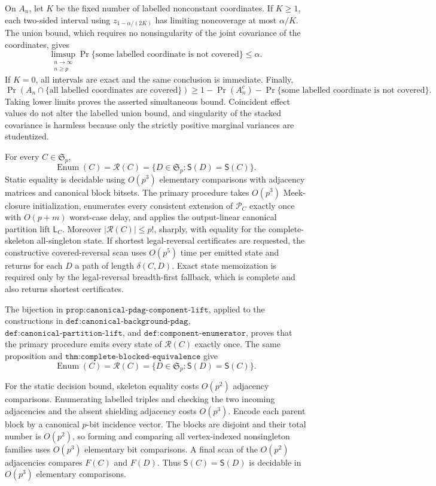 On \(A_n\), let \(K\) be the fixed number of labelled nonconstant coordinates. If \(K\geq1\), each two-sided interval using \(z_{1-\alpha/(2K)}\) has limiting noncoverage at most \(\alpha/K\). The union bound, which requires no nonsingularity of the joint covariance of the coordinates, gives
\[
 \limsup_{\substack{n\to\infty\\ n\geq p}}
 \Pr\{\text{some labelled coordinate is not covered}\}
 \leq\alpha.
\]
If \(K=0\), all intervals are exact and the same conclusion is immediate. Finally,
\[
 \Pr(A_n\cap\{\text{all labelled coordinates are covered}\})
 \geq1-\Pr(A_n^c)
 -\Pr\{\text{some labelled coordinate is not covered}\}.
\]
Taking lower limits proves the asserted simultaneous bound. Coincident effect values do not alter the labelled union bound, and singularity of the stacked covariance is harmless because only the strictly positive marginal variances are studentized.

For every \(C\in\mathfrak S_p\),
\[
 \operatorname{Enum}(C)=\mathcal R(C)
 =\{D\in\mathfrak S_p:\mathsf S(D)=\mathsf S(C)\}.
\]
Static equality is decidable using \(O(p^3)\) elementary comparisons with adjacency matrices and canonical block bitsets. The primary procedure takes \(O(p^3)\) Meek-closure initialization, enumerates every consistent extension of \(\mathcal P_C\) exactly once with \(O(p+m)\) worst-case delay, and applies the output-linear canonical partition lift \(\mathsf L_C\). Moreover \(|\mathcal R(C)|\leq p!\), sharply, with equality for the complete-skeleton all-singleton state. If shortest legal-reversal certificates are requested, the constructive covered-reversal scan uses \(O(p^5)\) time per emitted state and returns for each \(D\) a path of length \(\delta(C,D)\). Exact state memoization is required only by the legal-reversal breadth-first fallback, which is complete and also returns shortest certificates.

The bijection in \(\texttt{prop:canonical-pdag-component-lift}\), applied to the constructions in \(\texttt{def:canonical-background-pdag}\), \(\texttt{def:canonical-partition-lift}\), and \(\texttt{def:component-enumerator}\), proves that the primary procedure emits every state of \(\mathcal R(C)\) exactly once. The same proposition and \(\texttt{thm:complete-blocked-equivalence}\) give
\[
 \operatorname{Enum}(C)=\mathcal R(C)
 =\{D\in\mathfrak S_p:\mathsf S(D)=\mathsf S(C)\}.
\]

For the static decision bound, skeleton equality costs \(O(p^2)\) adjacency comparisons. Enumerating labelled triples and checking the two incoming adjacencies and the absent shielding adjacency costs \(O(p^3)\). Encode each parent block by a canonical \(p\)-bit incidence vector. The blocks are disjoint and their total number is \(O(p^2)\), so forming and comparing all vertex-indexed nonsingleton families uses \(O(p^3)\) elementary bit comparisons. A final scan of the \(O(p^2)\) adjacencies compares \(F(C)\) and \(F(D)\). Thus \(\mathsf S(C)=\mathsf S(D)\) is decidable in \(O(p^3)\) elementary comparisons.

